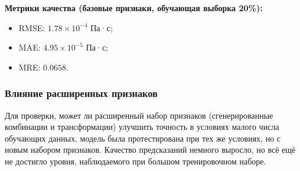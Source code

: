 \documentclass[a4paper,12pt]{article}
\begin{document}
      \begin{minipage}{\textwidth}
        \textbf{Метрики качества (базовые признаки, обучающая выборка 20\%):}
        \begin{itemize}
          \item RMSE: \( 1.78 \times 10^{-4} \) Па·с;
          \item MAE: \( 4.95 \times 10^{-5} \) Па·с;
          \item MRE: \( 0.0658 \).
        \end{itemize}
      \end{minipage}

    \subsubsection{Влияние расширенных признаков}

      Для проверки, может ли расширенный набор признаков (сгенерированные комбинации и трансформации) улучшить точность в условиях малого числа обучающих данных, модель была протестирована при тех же условиях, но с новым набором признаков. Качество предсказаний немного выросло, но всё ещё не достигло уровня, наблюдаемого при большом тренировочном наборе.
      
\end{document}
